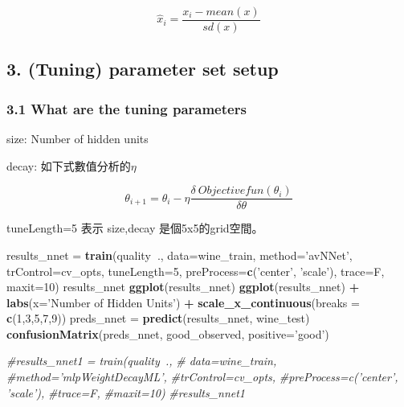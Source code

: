 \documentclass[]{book}
\newenvironment{Shaded}{\begin{snugshade}}{\end{snugshade}}
\newcommand{\KeywordTok}[1]{\textcolor[rgb]{0.13,0.29,0.53}{\textbf{#1}}}
\newcommand{\DataTypeTok}[1]{\textcolor[rgb]{0.13,0.29,0.53}{#1}}
\newcommand{\DecValTok}[1]{\textcolor[rgb]{0.00,0.00,0.81}{#1}}
\newcommand{\StringTok}[1]{\textcolor[rgb]{0.31,0.60,0.02}{#1}}
\newcommand{\CommentTok}[1]{\textcolor[rgb]{0.56,0.35,0.01}{\textit{#1}}}
\newcommand{\OperatorTok}[1]{\textcolor[rgb]{0.81,0.36,0.00}{\textbf{#1}}}
\newcommand{\NormalTok}[1]{#1}
\begin{document}
\[\hat{x}_i=\frac{x_i-mean(x)}{sd(x)}\]

\hypertarget{tuning-parameter-set-setup}{%
\subsection{3. (Tuning) parameter set setup}\label{tuning-parameter-set-setup}}

\hypertarget{what-are-the-tuning-parameters}{%
\subsubsection{3.1 What are the tuning parameters}\label{what-are-the-tuning-parameters}}

size: Number of hidden units

decay: 如下式數值分析的\(\eta\)

\[\theta_{i+1}=\theta_{i}-\eta\frac{\delta\ Objectivefun(\theta_i)}{\delta \theta}\]

tuneLength=5 表示 size,decay 是個5x5的grid空間。

\begin{Shaded}
\begin{Highlighting}[]
\NormalTok{results_nnet =}\StringTok{ }\KeywordTok{train}\NormalTok{(quality}\OperatorTok{~}\NormalTok{., }
                     \DataTypeTok{data=}\NormalTok{wine_train, }
                     \DataTypeTok{method=}\StringTok{'avNNet'}\NormalTok{,}
                     \DataTypeTok{trControl=}\NormalTok{cv_opts,}
                     \DataTypeTok{tuneLength=}\DecValTok{5}\NormalTok{,}
                     \DataTypeTok{preProcess=}\KeywordTok{c}\NormalTok{(}\StringTok{'center'}\NormalTok{, }\StringTok{'scale'}\NormalTok{),}
                     \DataTypeTok{trace=}\NormalTok{F, }
                     \DataTypeTok{maxit=}\DecValTok{10}\NormalTok{)}
\NormalTok{results_nnet}
\KeywordTok{ggplot}\NormalTok{(results_nnet)}
\KeywordTok{ggplot}\NormalTok{(results_nnet) }\OperatorTok{+}
\StringTok{  }\KeywordTok{labs}\NormalTok{(}\DataTypeTok{x=}\StringTok{'Number of Hidden Units'}\NormalTok{) }\OperatorTok{+}
\StringTok{  }\KeywordTok{scale_x_continuous}\NormalTok{(}\DataTypeTok{breaks =} \KeywordTok{c}\NormalTok{(}\DecValTok{1}\NormalTok{,}\DecValTok{3}\NormalTok{,}\DecValTok{5}\NormalTok{,}\DecValTok{7}\NormalTok{,}\DecValTok{9}\NormalTok{))}
\NormalTok{preds_nnet =}\StringTok{ }\KeywordTok{predict}\NormalTok{(results_nnet, wine_test)}
\KeywordTok{confusionMatrix}\NormalTok{(preds_nnet, good_observed, }\DataTypeTok{positive=}\StringTok{'good'}\NormalTok{)}


\CommentTok{#results_nnet1 = train(quality~., }
                    \CommentTok{# data=wine_train, }
                     \CommentTok{#method='mlpWeightDecayML',}
                     \CommentTok{#trControl=cv_opts,}
                     \CommentTok{#preProcess=c('center', 'scale'),}
                     \CommentTok{#trace=F, }
                     \CommentTok{#maxit=10)}
\CommentTok{#results_nnet1}
\end{Highlighting}
\end{Shaded}
\end{document}
